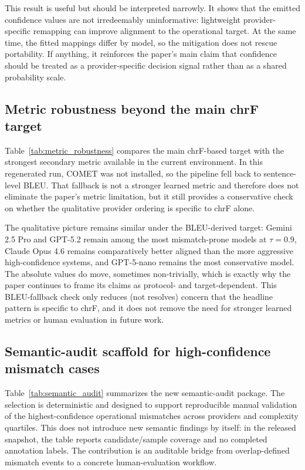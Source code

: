 \documentclass[10pt,conference]{IEEEtran}
\begin{document}
This result is useful but should be interpreted narrowly. It shows that the emitted confidence values are not irredeemably uninformative: lightweight provider-specific remapping can improve alignment to the operational target. At the same time, the fitted mappings differ by model, so the mitigation does not rescue portability. If anything, it reinforces the paper's main claim that confidence should be treated as a provider-specific decision signal rather than as a shared probability scale.



\subsection{Metric robustness beyond the main chrF target}
Table~\ref{tab:metric_robustness} compares the main chrF-based target with the strongest secondary metric available in the current environment. In this regenerated run, COMET was not installed, so the pipeline fell back to sentence-level BLEU. That fallback is not a stronger learned metric and therefore does not eliminate the paper's metric limitation, but it still provides a conservative check on whether the qualitative provider ordering is specific to chrF alone.

The qualitative picture remains similar under the BLEU-derived target: Gemini 2.5 Pro and GPT-5.2 remain among the most mismatch-prone models at $\tau=0.9$, Claude Opus 4.6 remains comparatively better aligned than the more aggressive high-confidence systems, and GPT-5-nano remains the most conservative model. The absolute values do move, sometimes non-trivially, which is exactly why the paper continues to frame its claims as protocol- and target-dependent. This BLEU-fallback check only reduces (not resolves) concern that the headline pattern is specific to chrF, and it does not remove the need for stronger learned metrics or human evaluation in future work.



\subsection{Semantic-audit scaffold for high-confidence mismatch cases}
Table~\ref{tab:semantic_audit} summarizes the new semantic-audit package. The selection is deterministic and designed to support reproducible manual validation of the highest-confidence operational mismatches across providers and complexity quartiles. This does not introduce new semantic findings by itself: in the released snapshot, the table reports candidate/sample coverage and no completed annotation labels. The contribution is an auditable bridge from overlap-defined mismatch events to a concrete human-evaluation workflow.
\end{document}
